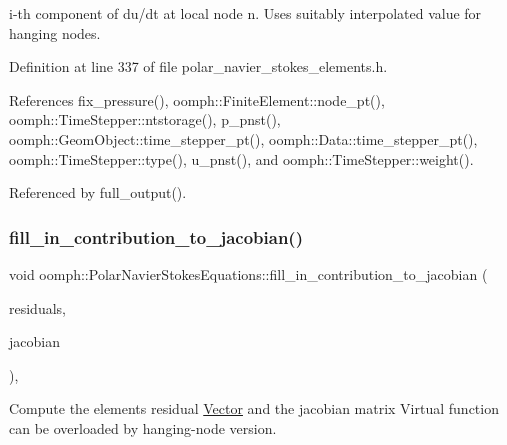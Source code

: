 i-\/th component of du/dt at local node n. Uses suitably interpolated value for hanging nodes. 



Definition at line 337 of file polar\+\_\+navier\+\_\+stokes\+\_\+elements.\+h.



References fix\+\_\+pressure(), oomph\+::\+Finite\+Element\+::node\+\_\+pt(), oomph\+::\+Time\+Stepper\+::ntstorage(), p\+\_\+pnst(), oomph\+::\+Geom\+Object\+::time\+\_\+stepper\+\_\+pt(), oomph\+::\+Data\+::time\+\_\+stepper\+\_\+pt(), oomph\+::\+Time\+Stepper\+::type(), u\+\_\+pnst(), and oomph\+::\+Time\+Stepper\+::weight().



Referenced by full\+\_\+output().

\mbox{\label{classoomph_1_1PolarNavierStokesEquations_a2724cc076b394e59305ed1f7610dfa4f}} 
\subsubsection{\texorpdfstring{fill\+\_\+in\+\_\+contribution\+\_\+to\+\_\+jacobian()}{fill\_in\_contribution\_to\_jacobian()}}
{\footnotesize\ttfamily void oomph\+::\+Polar\+Navier\+Stokes\+Equations\+::fill\+\_\+in\+\_\+contribution\+\_\+to\+\_\+jacobian (\begin{DoxyParamCaption}\item[{\hyperlink{classoomph_1_1Vector}{Vector}$<$ double $>$ \&}]{residuals,  }\item[{\hyperlink{classoomph_1_1DenseMatrix}{Dense\+Matrix}$<$ double $>$ \&}]{jacobian }\end{DoxyParamCaption})\hspace{0.3cm}{\ttfamily [inline]}, {\ttfamily [virtual]}}



Compute the element\textquotesingle{}s residual \hyperlink{classoomph_1_1Vector}{Vector} and the jacobian matrix Virtual function can be overloaded by hanging-\/node version. 



